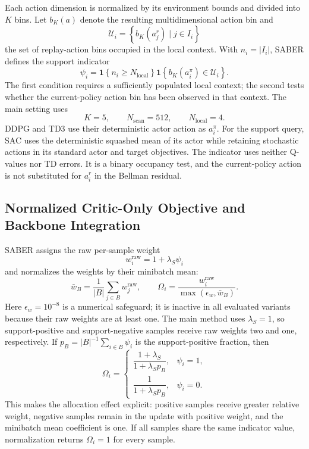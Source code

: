 \documentclass[letterpaper]{article}
\begin{document}
Each action dimension is normalized by its environment bounds and
divided into \(K\) bins.  Let \(b_K(a)\) denote the resulting
multidimensional action bin and
\begin{equation}
\mathcal U_i=
\left\{
b_K(a_j^r)\mid j\in I_i
\right\}
\end{equation}
the set of replay-action bins occupied in the local context.  With
\(n_i=|I_i|\), SABER defines the support indicator
\begin{equation}
\psi_i=
\mathbf 1\!\left\{n_i\geq N_{\mathrm{local}}\right\}
\mathbf 1\!\left\{b_K(a_i^\pi)\in\mathcal U_i\right\}.
\end{equation}
The first condition requires a sufficiently populated local context;
the second tests whether the current-policy action bin has
been observed in that context.  The main setting uses
\begin{equation}
K=5,\qquad N_{\mathrm{scan}}=512,\qquad
N_{\mathrm{local}}=4.
\end{equation}
DDPG and TD3 use their deterministic actor action as \(a_i^\pi\).
For the support query, SAC uses the deterministic squashed mean of its
actor while retaining stochastic actions in its standard actor and
target objectives.  The indicator uses neither Q-values nor TD
errors.  It is a binary occupancy test, and the current-policy action
is not substituted for \(a_i^r\) in the Bellman residual.

\subsection{Normalized Critic-Only Objective and Backbone Integration}

SABER assigns the raw per-sample weight
\begin{equation}
w_i^{\mathrm{raw}}=1+\lambda_S\psi_i
\end{equation}
and normalizes the weights by their minibatch mean:
\begin{equation}
\bar w_B=
\frac{1}{|B|}\sum_{j\in B}w_j^{\mathrm{raw}},
\qquad
\Omega_i=
\frac{w_i^{\mathrm{raw}}}
{\max(\epsilon_w,\bar w_B)}.
\end{equation}
Here \(\epsilon_w=10^{-8}\) is a numerical safeguard; it is
inactive in all evaluated variants because their raw weights are at
least one.
The main method uses \(\lambda_S=1\), so support-positive and
support-negative samples receive raw weights two and one,
respectively.  If
\(p_B=|B|^{-1}\sum_{i\in B}\psi_i\) is the support-positive fraction,
then
\begin{equation}
\Omega_i=
\begin{cases}
\dfrac{1+\lambda_S}{1+\lambda_S p_B},
& \psi_i=1,\\[2mm]
\dfrac{1}{1+\lambda_S p_B},
& \psi_i=0.
\end{cases}
\end{equation}
This makes the allocation effect explicit: positive samples receive
greater relative weight, negative samples remain in the update with
positive weight, and the minibatch mean coefficient is one.  If all
samples share the same indicator value, normalization returns
\(\Omega_i=1\) for every sample.
\end{document}
